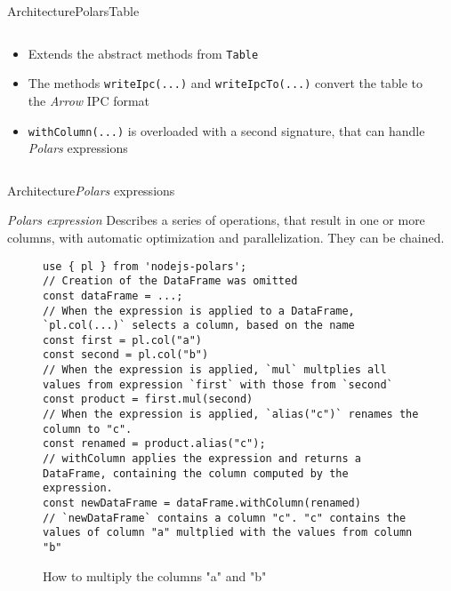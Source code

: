 \begin{frame}[t]{Architecture}{PolarsTable}
	\begin{columns}[T]
		\begin{column}{0.6\linewidth}
			\begin{itemize}
				\item Extends the abstract methods from \Verb|Table|
				\item The methods \Verb|writeIpc(...)| and \Verb|writeIpcTo(...)| convert the table to the \emph{Arrow} IPC format
				\item \Verb|withColumn(...)| is overloaded with a second signature, that can handle \emph{Polars} expressions
			\end{itemize}
		\end{column}
		\begin{column}{0.4\linewidth}
			\vfill
			\small
			
			\vfill
		\end{column}
	\end{columns}
\end{frame}
\begin{frame}[t,fragile]{Architecture}{\emph{Polars} expressions}
	\begin{block}{\emph{Polars expression}}
		Describes a series of operations, that result in one or more columns, with automatic optimization and parallelization\footnotemark[1].
		They can be chained.
	\end{block}
	\pause
	\scriptsize
	\begin{figure}
		\begin{verbatim}
use { pl } from 'nodejs-polars';
// Creation of the DataFrame was omitted
const dataFrame = ...;
// When the expression is applied to a DataFrame, `pl.col(...)` selects a column, based on the name
const first = pl.col("a")
const second = pl.col("b")
// When the expression is applied, `mul` multplies all values from expression `first` with those from `second`
const product = first.mul(second)
// When the expression is applied, `alias("c")` renames the column to "c".
const renamed = product.alias("c");
// withColumn applies the expression and returns a DataFrame, containing the column computed by the expression.
const newDataFrame = dataFrame.withColumn(renamed)
// `newDataFrame` contains a column "c". "c" contains the values of column "a" multplied with the values from column "b"
	\end{verbatim}
		\caption{How to multiply the columns "a" and "b"}
	\end{figure}
\end{frame}
